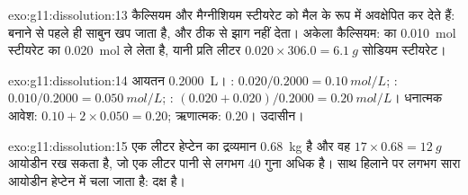 \begin{solution}{exo:g11:dissolution:13}
कैल्सियम और मैग्नीशियम  स्टीयरेट  को मैल के रूप में अवक्षेपित कर देते हैं:
 बनाने से पहले ही साबुन खप जाता है, और ठीक से झाग नहीं देता।
अकेला कैल्सियम:  का \qty{0.010}{mol}
स्टीयरेट का \qty{0.020}{mol} ले लेता है, यानी प्रति लीटर $0.020 \times 306.0 =
\qty{6.1}{g}$ सोडियम स्टीयरेट।
\end{solution}

\begin{solution}{exo:g11:dissolution:14}
आयतन \qty{0.2000}{L}। : $0.020 / 0.2000 = \qty{0.10}{mol/L}$;
: $0.010 / 0.2000 = \qty{0.050}{mol/L}$; :
$(0.020 + 0.020) / 0.2000 = \qty{0.20}{mol/L}$। धनात्मक आवेश:
$0.10 + 2 \times 0.050 = 0.20$; ऋणात्मक: $0.20$। उदासीन।
\end{solution}

\begin{solution}{exo:g11:dissolution:15}
एक लीटर हेप्टेन का द्रव्यमान \qty{0.68}{kg} है और वह
$17 \times 0.68 = \qty{12}{g}$ आयोडीन रख सकता है, जो एक लीटर पानी से लगभग 40 गुना
अधिक है। साथ हिलाने पर लगभग सारा आयोडीन हेप्टेन में चला जाता है:
 दक्ष है।
\end{solution}

